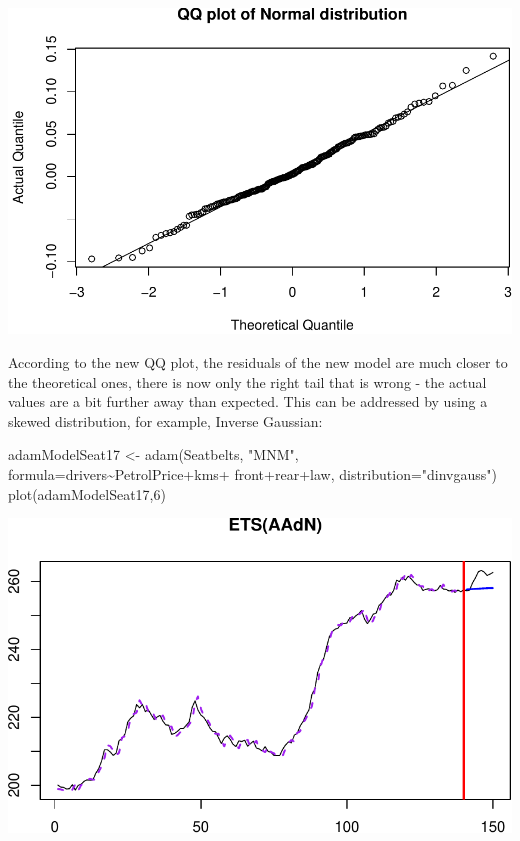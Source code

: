 \documentclass[
]{book}
\newenvironment{Shaded}{\begin{snugshade}}{\end{snugshade}}
\newcommand{\AttributeTok}[1]{\textcolor[rgb]{0.77,0.63,0.00}{#1}}
\newcommand{\DecValTok}[1]{\textcolor[rgb]{0.00,0.00,0.81}{#1}}
\newcommand{\FunctionTok}[1]{\textcolor[rgb]{0.00,0.00,0.00}{#1}}
\newcommand{\NormalTok}[1]{#1}
\newcommand{\OtherTok}[1]{\textcolor[rgb]{0.56,0.35,0.01}{#1}}
\newcommand{\SpecialCharTok}[1]{\textcolor[rgb]{0.00,0.00,0.00}{#1}}
\newcommand{\StringTok}[1]{\textcolor[rgb]{0.31,0.60,0.02}{#1}}
\theoremstyle{definition}
\theoremstyle{definition}
\theoremstyle{definition}
\theoremstyle{definition}
\theoremstyle{remark}
\begin{document}
\includegraphics{adam_files/figure-latex/unnamed-chunk-162-1.pdf}

According to the new QQ plot, the residuals of the new model are much closer to the theoretical ones, there is now only the right tail that is wrong - the actual values are a bit further away than expected. This can be addressed by using a skewed distribution, for example, Inverse Gaussian:

\begin{Shaded}
\begin{Highlighting}[]
\NormalTok{adamModelSeat17 }\OtherTok{\textless{}{-}} \FunctionTok{adam}\NormalTok{(Seatbelts, }\StringTok{"MNM"}\NormalTok{,}
                        \AttributeTok{formula=}\NormalTok{drivers}\SpecialCharTok{\textasciitilde{}}\NormalTok{PetrolPrice}\SpecialCharTok{+}\NormalTok{kms}\SpecialCharTok{+}
\NormalTok{                          front}\SpecialCharTok{+}\NormalTok{rear}\SpecialCharTok{+}\NormalTok{law,}
                        \AttributeTok{distribution=}\StringTok{"dinvgauss"}\NormalTok{)}
\FunctionTok{plot}\NormalTok{(adamModelSeat17,}\DecValTok{6}\NormalTok{)}
\end{Highlighting}
\end{Shaded}

\includegraphics{adam_files/figure-latex/unnamed-chunk-163-1.pdf}
\end{document}

